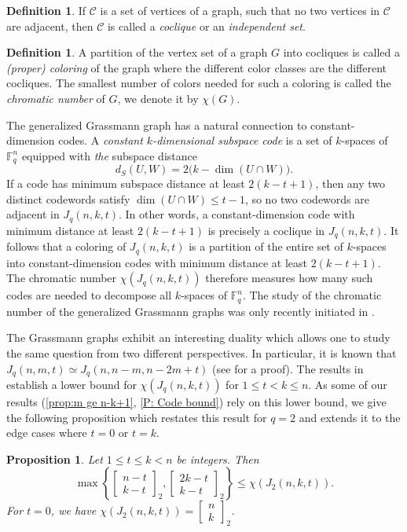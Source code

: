 \documentclass[12pt]{article}
\newtheorem{prop}[thm]{Proposition}
\theoremstyle{definition}
\newtheorem{defn}[thm]{Definition}
\newcommand{\Gauss}[2]{{\begin{bmatrix} #1 \\ #2 \end{bmatrix}_2}}
\newcommand{\F}{\mathbb F}
\newcounter{numb}
\begin{document}
\begin{defn}
    If $\mathcal{C}$ is a set of vertices of a graph, such that no two vertices in $\mathcal{C}$ are adjacent, then $\mathcal{C}$ is called a \emph{coclique} or an \emph{independent set}.
\end{defn}

\begin{defn}
    A partition of the vertex set of a graph $G$ into cocliques is called a \emph{(proper) coloring} of the graph where the different color classes are the different cocliques. The smallest number of colors needed for such a coloring is called the \emph{chromatic number} of $G$, we denote it by $\chi(G)$.
\end{defn}

The generalized Grassmann graph has a natural connection to constant-dimension codes. A \emph{constant $k$-dimensional subspace code} is a set of $k$-spaces of $\F_q^n$ equipped with \textit{the} subspace distance
$$d_S(U,W)=2\bigl(k-\dim(U\cap W)\bigr).$$
If a code has minimum subspace distance at least $2(k-t+1)$, then any two distinct codewords satisfy $\dim(U\cap W)\le t-1$, so no two codewords are adjacent in $J_q(n,k,t)$. In other words, a constant-dimension code with minimum distance at least $2(k-t+1)$ is precisely a coclique in $J_q(n,k,t)$. It follows that a coloring of $J_q(n,k,t)$ is a partition of the entire set of $k$-spaces into constant-dimension codes with minimum distance at least $2(k-t+1)$. The chromatic number $\chi(J_q(n,k,t))$ therefore measures how many such codes are needed to decompose all $k$-spaces of $\F_q^n$. The study of the chromatic number of the generalized Grassmann graphs was only recently initiated in \cite{dhaeseleer2026chromaticnumbergrassmanngraphs}.

The Grassmann graphs exhibit an interesting duality which allows one to study the same question from two different perspectives. In particular, it is known that $J_q(n,m,t)\simeq J_q(n,n-m,n-2m+t)$ (see \cite{dhaeseleer2026chromaticnumbergrassmanngraphs} for a proof). The results in \cite{dhaeseleer2026chromaticnumbergrassmanngraphs} establish a lower bound for $\chi(J_q(n, k, t))$ for $1 \leq t < k \leq n$. As some of our results (\cref{prop:m ge n-k+1}, \cref{P: Code bound}) rely on this lower bound, we give the following proposition which restates this result for $q = 2$ and extends it to the edge cases where $t = 0$ or $t = k$.

\begin{prop}
\label{P: general bound chromatic number}
Let $1\leq t \leq k < n$ be integers. Then
\[
 \max \left\{ \Gauss{n-t}{ k-t },  \Gauss{2k-t}{ k-t } \right\} \leq \chi(J_2(n, k, t)) .
\]
For $t=0$, we have $\chi(J_2(n, k, t))=\Gauss{n}{k}$.
\end{prop}
\end{document}
